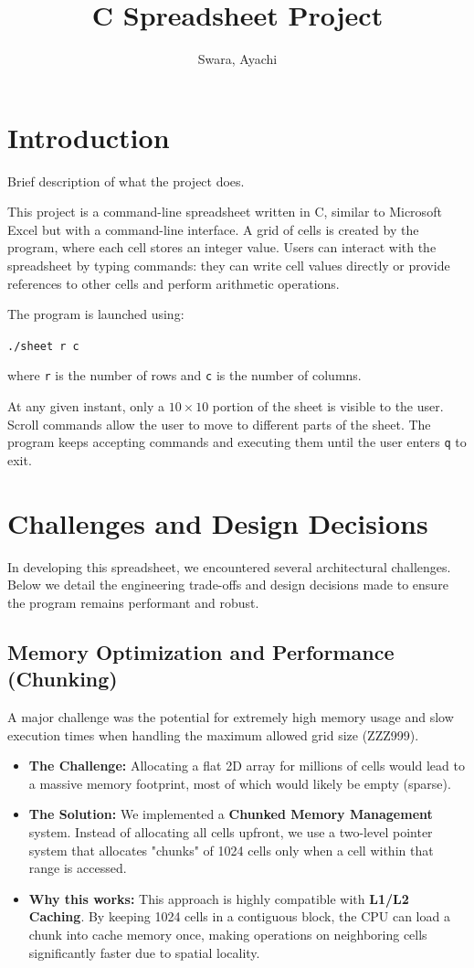 \documentclass[twocolumn]{article}
\title{C Spreadsheet Project}
\author{Swara, Ayachi}
\date{}
\begin{document}
\maketitle

\section{Introduction}

Brief description of what the project does.

This project is a command-line spreadsheet written in C, similar to Microsoft Excel but with a command-line interface. A grid of cells is created by the program, where each cell stores an integer value. Users can interact with the spreadsheet by typing commands: they can write cell values directly or provide references to other cells and perform arithmetic operations.

The program is launched using:

\texttt{./sheet r c}

where \texttt{r} is the number of rows and \texttt{c} is the number of columns.

At any given instant, only a $10\times10$ portion of the sheet is visible to the user. Scroll commands allow the user to move to different parts of the sheet. The program keeps accepting commands and executing them until the user enters \texttt{q} to exit.

\section{Challenges and Design Decisions}

In developing this spreadsheet, we encountered several architectural challenges. Below we detail the engineering trade-offs and design decisions made to ensure the program remains performant and robust.

\subsection{Memory Optimization and Performance (Chunking)}
A major challenge was the potential for extremely high memory usage and slow execution times when handling the maximum allowed grid size (ZZZ999). 
\begin{itemize}
    \item \textbf{The Challenge:} Allocating a flat 2D array for millions of cells would lead to a massive memory footprint, most of which would likely be empty (sparse).
    \item \textbf{The Solution:} We implemented a \textbf{Chunked Memory Management} system. Instead of allocating all cells upfront, we use a two-level pointer system that allocates "chunks" of 1024 cells only when a cell within that range is accessed.
    \item \textbf{Why this works:} This approach is highly compatible with \textbf{L1/L2 Caching}. By keeping 1024 cells in a contiguous block, the CPU can load a chunk into cache memory once, making operations on neighboring cells significantly faster due to spatial locality.
\end{itemize}
\end{document}
